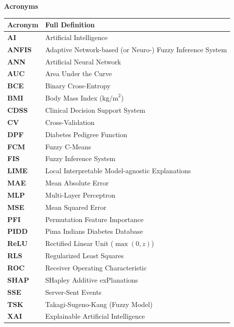 \documentclass[12pt,a4paper,oneside]{report}
\begin{document}
{\linespread{0.95}\selectfont
\begin{center}
{\fontsize{11}{14}\selectfont \bfseries Acronyms}\\[0.15cm]
\footnotesize
\begin{tabularx}{\textwidth}{l X}
\toprule
\textbf{Acronym} & \textbf{Full Definition} \\
\midrule
\textbf{AI} & Artificial Intelligence \\
\textbf{ANFIS} & Adaptive Network-based (or Neuro-) Fuzzy Inference System \\
\textbf{ANN} & Artificial Neural Network \\
\textbf{AUC} & Area Under the Curve \\
\textbf{BCE} & Binary Cross-Entropy \\
\textbf{BMI} & Body Mass Index ($\text{kg/m}^2$) \\
\textbf{CDSS} & Clinical Decision Support System \\
\textbf{CV} & Cross-Validation \\
\textbf{DPF} & Diabetes Pedigree Function \\
\textbf{FCM} & Fuzzy C-Means \\
\textbf{FIS} & Fuzzy Inference System \\
\textbf{LIME} & Local Interpretable Model-agnostic Explanations \\
\textbf{MAE} & Mean Absolute Error \\
\textbf{MLP} & Multi-Layer Perceptron \\
\textbf{MSE} & Mean Squared Error \\
\textbf{PFI} & Permutation Feature Importance \\
\textbf{PIDD} & Pima Indians Diabetes Database \\
\textbf{ReLU} & Rectified Linear Unit ($\max(0, z)$) \\
\textbf{RLS} & Regularized Least Squares \\
\textbf{ROC} & Receiver Operating Characteristic \\
\textbf{SHAP} & SHapley Additive exPlanations \\
\textbf{SSE} & Server-Sent Events \\
\textbf{TSK} & Takagi-Sugeno-Kang (Fuzzy Model) \\
\textbf{XAI} & Explainable Artificial Intelligence \\
\bottomrule
\end{tabularx}
\end{center}

}
\end{document}
